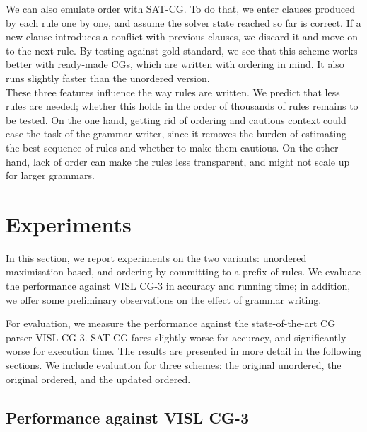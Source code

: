 We can also emulate order with SAT-CG. To do that, we enter clauses
produced by each rule one by one, and assume the solver state reached
so far is correct. If a new clause introduces a conflict with
previous clauses, we discard it and move on to the next rule.
By testing against gold standard, we see that this scheme works better
with ready-made CGs, which are written with ordering in mind.
It also runs slightly faster than the unordered version.
\\



\noindent These three features influence the way rules are written. 
We predict that less rules are needed; whether this holds in the order
of thousands of rules remains to be tested. On the one hand, getting rid
of ordering and cautious context could ease the task of the grammar
writer, since it removes the burden of estimating the best sequence of
rules and whether to make them cautious. On the other
hand, lack of order can make the rules less transparent, and might not scale up for larger grammars.


\section{Experiments}
\label{sec:eval}

In this section, we report experiments on the two variants: unordered maximisation-based, and ordering by committing to a prefix of rules.
We evaluate the performance against VISL CG-3 in accuracy and running time; in addition, we offer some preliminary observations on the effect of grammar writing.


For evaluation, we measure the performance against the state-of-the-art CG parser VISL CG-3.
SAT-CG fares slightly worse for accuracy, and significantly worse for execution time.
The results are presented in more detail in the following sections.
We include evaluation for three schemes: the original unordered, the original ordered, and the updated ordered.




\subsection{Performance against VISL CG-3}


